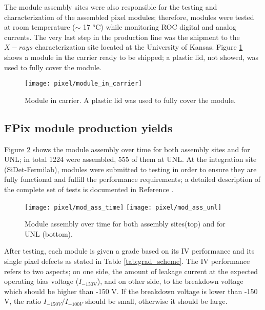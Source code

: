 The module assembly sites were also responsible for the testing and characterization of the assembled pixel modules; therefore, modules were tested at room temperature ($\sim$ 17 $^o$C) while monitoring ROC
digital and analog currents. The very last step in the production line was the shipment to the $X-rays$ characterization site located at the University of Kansas. Figure \ref{fig:module_in_carrier} shows a module in the carrier ready to be shipped; a plastic lid, not showed, was used to fully cover the module.       

\begin{figure}[h]
\begin{center}
  \texttt{[image: pixel/module\_in\_carrier]}
 \caption[Module in carrier.]{Module in carrier. A plastic lid was used to fully cover the module.}\label{fig:module_in_carrier}
\end{center}
\end{figure}

\subsection{FPix module production yields}

Figure \ref{fig:mod_ass_time} shows the module assembly over time for both assembly sites and for UNL; in total 1224 were assembled, 555 of them at UNL. At the integration site (SiDet-Fermilab), modules were submitted to testing in order to ensure they are fully functional and fulfill the performance requirements; a detailed description of the complete set of tests is documented in Reference \cite{fpix_module_testing_guide}.

\begin{figure}[h]
\begin{center}
  \texttt{[image: pixel/mod\_ass\_time]}
  \texttt{[image: pixel/mod\_ass\_unl]}
 \caption[Module assembly over time.]{Module assembly over time for both assembly sites(top) and for UNL (bottom).}\label{fig:mod_ass_time}
\end{center}
\end{figure}

After testing, each module is given a grade based on its IV performance and its single pixel defects as stated in Table \ref{tab:grad_scheme}. The IV performance refers to two aspects; on one side, the amount of leakage current at the expected operating bias voltage ($I_{-150\textrm{V}}$), and on other side, to the breakdown voltage which should be higher than -150 V. If the breakdown voltage is lower than -150 V, the ratio $I_{-150V}/I_{-100V}$ should be small, otherwise it should be large.      

